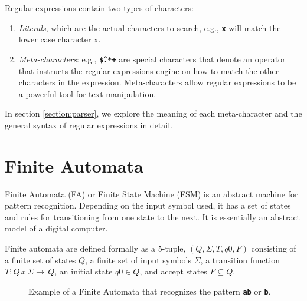 Regular expressions contain two types of characters:
\begin{enumerate}
    \item \textit{Literals}, which are the actual characters to search, e.g., \texttt{\textbf{x}} will match the lower case character x.
    \item \textit{Meta-characters}: e.g., \texttt{\textbf{\^\$.*+}} are special characters that denote an operator that instructs the regular expressions engine on how to match the other characters in the expression. Meta-characters allow regular expressions to be a powerful tool for text manipulation.
\end{enumerate}

In section \ref{section:parser}, we explore the meaning of each meta-character and the general syntax of regular expressions in detail.

\section{Finite Automata}

Finite Automata (FA) or Finite State Machine (FSM) is an abstract machine for pattern recognition. Depending on the input symbol used, it has a set of states and rules for transitioning from one state to the next. It is essentially an abstract model of a digital computer. 

Finite automata are defined formally as a 5-tuple, $(Q, Σ, T, q0, F)$ consisting of a finite set of states $Q$, a finite set of input symbols $\Sigma$, a transition function $T: Q \, x \, Σ → \, Q$, an initial state $q0 ∈ Q$, and accept states $F \subseteq Q$.

\begin{figure}[H]
\centering
{}
\caption{Example of a Finite Automata that recognizes the pattern \texttt{\textbf{ab}} or \texttt{\textbf{b}}.}
\label{fig:fsm}
\end{figure}

